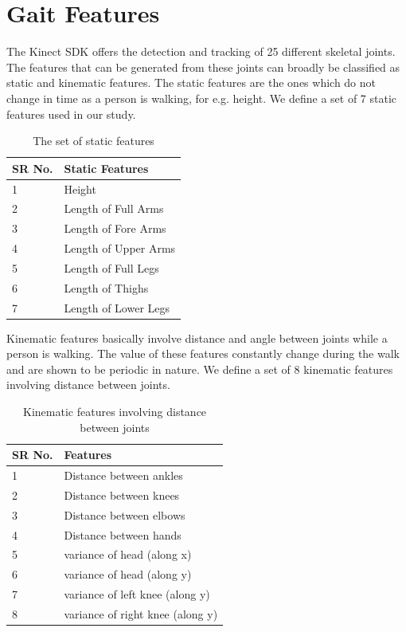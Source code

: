 \section{Gait Features} \label{Gait Features } 
\noindent The Kinect SDK offers the detection and tracking of 25 different skeletal joints. The features that can be generated from these joints can broadly be classified as static and kinematic features.
The static features are the ones which do not change in time as a person is walking, for e.g. height. We define a set of 7 static features used in our study.
\def\arraystretch{1.3}
\begin{table}[h]
\centering
\begin{tabular}{| p{2cm} | |p{5cm}|}
 \hline
\cellcolor{pink} SR No. & \cellcolor{pink} Static Features  \\ \hline
1 & Height \\ \hline
2 & Length of Full Arms \\ \hline
3 & Length of Fore Arms \\\hline
4 & Length of Upper Arms \\ \hline
5 & Length of Full Legs \\ \hline
6 & Length of Thighs \\\hline
7 & Length of Lower Legs \\ \hline
\end{tabular}
\caption{The set of static features}
\end{table}

\noindent Kinematic features basically involve distance and angle between joints while a person is walking. The value of these features constantly change during the walk and are shown to be periodic in nature. We define a set of 8 kinematic features involving distance between joints.
\def\arraystretch{1.3}
\begin{table}[h]
\centering
\begin{tabular}{| p{2cm} | |p{6cm}|}
 \hline
\cellcolor{pink} SR No. & \cellcolor{pink} Features  \\ \hline
1 & Distance between ankles \\ \hline
2 & Distance between knees \\ \hline
3 & Distance between elbows \\\hline
4 & Distance between hands \\ \hline
5 & variance of head (along x) \\ \hline
6 & variance of head (along y) \\\hline
7 & variance of left knee (along y) \\ \hline
8 & variance of right knee (along y) \\ \hline
\end{tabular}
\caption{ Kinematic features involving distance between joints}
\end{table}

